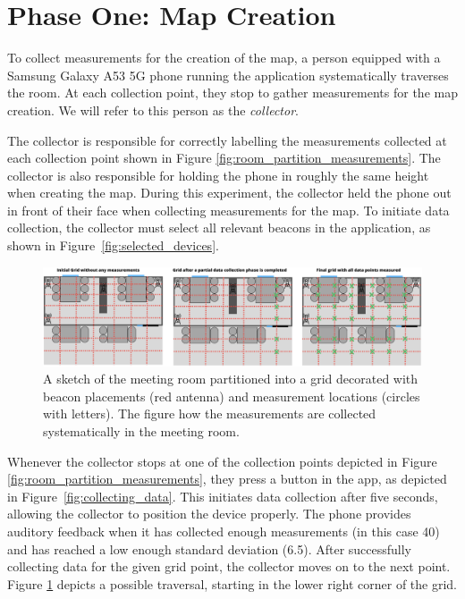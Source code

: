 \section{Phase One: Map Creation}\label{sec:eval_phase1}
To collect measurements for the creation of the map, a person equipped with a Samsung Galaxy A53 5G phone running the application systematically traverses the room. 
At each collection point, they stop to gather measurements for the map creation.
We will refer to this person as the \textit{collector}.

The collector is responsible for correctly labelling the measurements collected at each collection point shown in Figure \ref{fig:room_partition_measurements}. 
The collector is also responsible for holding the phone in roughly the same height when creating the map. 
During this experiment, the collector held the phone out in front of their face when collecting measurements for the map.
To initiate data collection, the collector must select all relevant beacons in the application, as shown in Figure~\ref{fig:selected_devices}.

\begin{figure}[h]
    \centering
    \includegraphics[width=\textwidth]{images/experiment_map_creation.png}
    \caption{A sketch of the meeting room partitioned into a grid decorated with beacon placements (red antenna) and measurement locations (circles with letters). The figure how the measurements are collected systematically in the meeting room.}
    \label{fig:experiment_map_creation}
\end{figure}
Whenever the collector stops at one of the collection points depicted in Figure \ref{fig:room_partition_measurements}, they press a button in the app, as depicted in Figure~\ref{fig:collecting_data}. This initiates data collection after five seconds, allowing the collector to position the device properly.
The phone provides auditory feedback when it has collected enough measurements (in this case 40) and has reached a low enough standard deviation (6.5).
After successfully collecting data for the given grid point, the collector moves on to the next point.
Figure \ref{fig:experiment_map_creation} depicts a possible traversal, starting in the lower right corner of the grid. 


